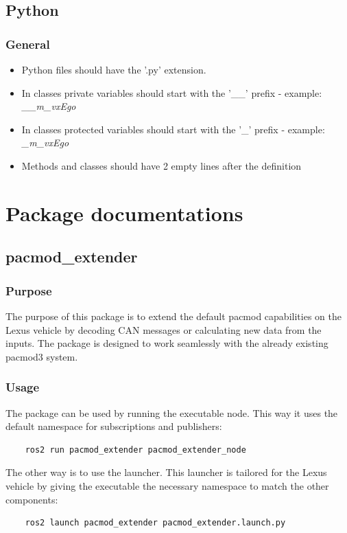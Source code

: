 \documentclass[sn-mathphys-num]{sn-jnl}%
\begin{document}
\subsection{Python}
\subsubsection{General}
\begin{itemize}
    \item Python files should have the '.py' extension.
    \item In classes private variables should start with the '\_\_' prefix - example: \emph{\_\_m\_vxEgo}
    \item In classes protected variables should start with the '\_' prefix - example: \emph{\_m\_vxEgo}
    \item Methods and classes should have 2 empty lines after the definition
\end{itemize}
\newpage

\section{Package documentations}
\subsection{pacmod\_extender}
\subsubsection{Purpose}
The purpose of this package is to extend the default pacmod capabilities on the Lexus vehicle by decoding CAN messages or calculating new data from the inputs. The package is designed to work seamlessly with the already existing pacmod3 system.
\subsubsection{Usage}
The package can be used by running the executable node. This way it uses the default namespace for subscriptions and publishers:
\begin{lstlisting}
    ros2 run pacmod_extender pacmod_extender_node
\end{lstlisting}
The other way is to use the launcher. This launcher is tailored for the Lexus vehicle by giving the executable the necessary namespace to match the other components:
\begin{lstlisting}
    ros2 launch pacmod_extender pacmod_extender.launch.py
\end{lstlisting}
\end{document}
